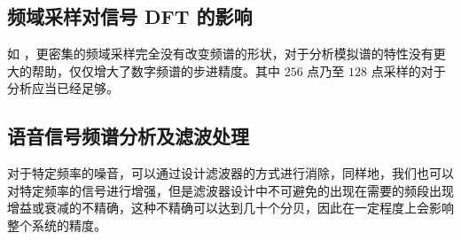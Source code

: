 \documentclass[lang=cn,11pt,a4paper,cite=authoryear]{elegantpaper}
\begin{document}
\subsection{频域采样对信号 DFT 的影响}

如  ，更密集的频域采样完全没有改变频谱的形状，对于分析模拟谱的特性没有更大的帮助，仅仅增大了数字频谱的步进精度。其中 \(256\) 点乃至 \(128\) 点采样的对于分析应当已经足够。

\subsection{语音信号频谱分析及滤波处理}

对于特定频率的噪音，可以通过设计滤波器的方式进行消除，同样地，我们也可以对特定频率的信号进行增强，但是滤波器设计中不可避免的出现在需要的频段出现增益或衰减的不精确，这种不精确可以达到几十个分贝，因此在一定程度上会影响整个系统的精度。


\end{document}

